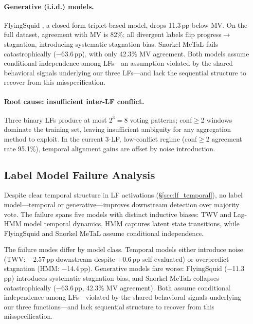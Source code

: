 \paragraph{Generative (i.i.d.) models.}
FlyingSquid \citep{fu2020flyingsquid}, a closed-form triplet-based model, drops 11.3\,pp below MV.
On the full dataset, agreement with MV is 82\%; all divergent labels flip progress$\to$stagnation, introducing systematic stagnation bias.
Snorkel MeTaL \citep{ratner2019snorkelmetal} fails catastrophically ($-$63.6\,pp), with only 42.3\% MV agreement.
Both models assume conditional independence among LFs---an assumption violated by the shared behavioral signals underlying our three LFs---and lack the sequential structure to recover from this misspecification.

\paragraph{Root cause: insufficient inter-LF conflict.}
Three binary LFs produce at most $2^3{=}8$ voting patterns; conf${\geq}$2 windows dominate the training set, leaving insufficient ambiguity for any aggregation method to exploit.
In the current 3-LF, low-conflict regime (conf${\geq}$2 agreement rate 95.1\%), temporal alignment gains are offset by noise introduction.

\subsection{Label Model Failure Analysis}
\label{sec:app_why_tlm}

Despite clear temporal structure in LF activations (\S\ref{sec:lf_temporal}), no label model---temporal or generative---improves downstream detection over majority vote.
The failure spans five models with distinct inductive biases: TWV and Lag-HMM model temporal dynamics, HMM captures latent state transitions, while FlyingSquid and Snorkel MeTaL assume conditional independence.

The failure modes differ by model class.
Temporal models either introduce noise (TWV: $-$2.57\,pp downstream despite $+$0.6\,pp self-evaluated) or overpredict stagnation (HMM: $-$14.4\,pp).
Generative models fare worse: FlyingSquid ($-$11.3\,pp) introduces systematic stagnation bias, and Snorkel MeTaL collapses catastrophically ($-$63.6\,pp, 42.3\% MV agreement).
Both assume conditional independence among LFs---violated by the shared behavioral signals underlying our three functions---and lack sequential structure to recover from this misspecification.

